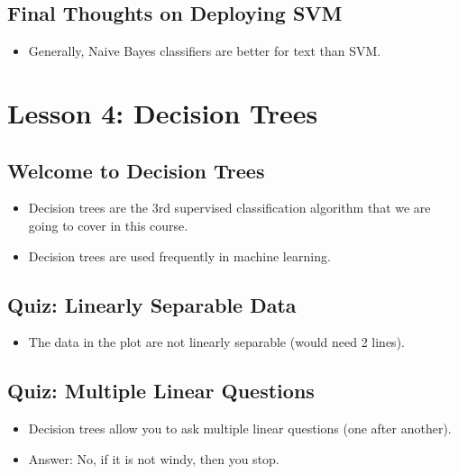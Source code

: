 \documentclass[12pt]{report}
\begin{document}
\subsection{Final Thoughts on Deploying SVM}

\begin{itemize}

\item Generally, Naive Bayes classifiers are better for text than SVM.

\end{itemize}

\section{Lesson 4: Decision Trees}

\subsection{Welcome to Decision Trees}

\begin{itemize}

\item Decision trees are the 3rd supervised classification algorithm that we are going to cover in this course. 

\item Decision trees are used frequently in machine learning. 

\end{itemize}

\subsection{Quiz: Linearly Separable Data}

\begin{itemize}

\item The data in the plot are not linearly separable (would need 2 lines). 

\end{itemize}

\subsection{Quiz: Multiple Linear Questions}

\begin{itemize}

\item Decision trees allow you to ask multiple linear questions (one after another). 

\item Answer: No, if it is not windy, then you stop.

\end{itemize}
\end{document}
